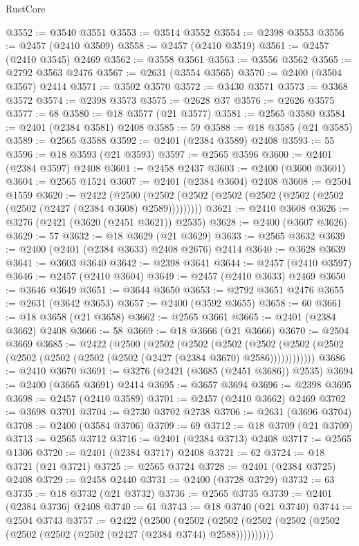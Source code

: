 \begin{lexlean}{RustCore}
\begin{coremodule}
@3552 := @3540 @3551
@3553 := @3514 @3552
@3554 := @2398 @3553
@3556 := @2457 (@2410 @3509)
@3558 := @2457 (@2410 @3519)
@3561 := @2457 (@2410 @3545) @2469
@3562 := @3558 @3561
@3563 := @3556 @3562
@3565 := @2792 @3563 @2476
@3567 := @2631 (@3554 @3565)
@3570 := @2400 (@3504 @3567) @2414
@3571 := @3502 @3570
@3572 := @3430 @3571
@3573 := @3368 @3572
@3574 := @2398 @3573
@3575 := @2628 @37
@3576 := @2626 @3575
@3577 := 68
@3580 := @18 @3577 (@21 @3577)
@3581 := @2565 @3580
@3584 := @2401 (@2384 @3581) @2408
@3585 := 59
@3588 := @18 @3585 (@21 @3585)
@3589 := @2565 @3588
@3592 := @2401 (@2384 @3589) @2408
@3593 := 55
@3596 := @18 @3593 (@21 @3593)
@3597 := @2565 @3596
@3600 := @2401 (@2384 @3597) @2408
@3601 := @2458 @2437
@3603 := @2400 (@3600 @3601)
@3604 := @2565 @1524
@3607 := @2401 (@2384 @3604) @2408
@3608 := @2504 @1559
@3620 := @2422
    (@2500 (@2502 (@2502 (@2502 (@2502 (@2502 (@2502 (@2502 (@2427 (@2384 @3608) @2589)))))))))
@3621 := @2410 @3608
@3626 := @3276 (@2421 (@3620 (@2451 @3621)) @2535)
@3628 := @2400 (@3607 @3626)
@3629 := 57
@3632 := @18 @3629 (@21 @3629)
@3633 := @2565 @3632
@3639 := @2400 (@2401 (@2384 @3633) @2408 @2676) @2414
@3640 := @3628 @3639
@3641 := @3603 @3640
@3642 := @2398 @3641
@3644 := @2457 (@2410 @3597)
@3646 := @2457 (@2410 @3604)
@3649 := @2457 (@2410 @3633) @2469
@3650 := @3646 @3649
@3651 := @3644 @3650
@3653 := @2792 @3651 @2476
@3655 := @2631 (@3642 @3653)
@3657 := @2400 (@3592 @3655)
@3658 := 60
@3661 := @18 @3658 (@21 @3658)
@3662 := @2565 @3661
@3665 := @2401 (@2384 @3662) @2408
@3666 := 58
@3669 := @18 @3666 (@21 @3666)
@3670 := @2504 @3669
@3685 := @2422
    (@2500
      (@2502
        (@2502
          (@2502
            (@2502 (@2502 (@2502 (@2502 (@2502 (@2502 (@2502 (@2427 (@2384 @3670) @2586))))))))))))
@3686 := @2410 @3670
@3691 := @3276 (@2421 (@3685 (@2451 @3686)) @2535)
@3694 := @2400 (@3665 @3691) @2414
@3695 := @3657 @3694
@3696 := @2398 @3695
@3698 := @2457 (@2410 @3589)
@3701 := @2457 (@2410 @3662) @2469
@3702 := @3698 @3701
@3704 := @2730 @3702 @2738
@3706 := @2631 (@3696 @3704)
@3708 := @2400 (@3584 @3706)
@3709 := 69
@3712 := @18 @3709 (@21 @3709)
@3713 := @2565 @3712
@3716 := @2401 (@2384 @3713) @2408
@3717 := @2565 @1306
@3720 := @2401 (@2384 @3717) @2408
@3721 := 62
@3724 := @18 @3721 (@21 @3721)
@3725 := @2565 @3724
@3728 := @2401 (@2384 @3725) @2408
@3729 := @2458 @2440
@3731 := @2400 (@3728 @3729)
@3732 := 63
@3735 := @18 @3732 (@21 @3732)
@3736 := @2565 @3735
@3739 := @2401 (@2384 @3736) @2408
@3740 := 61
@3743 := @18 @3740 (@21 @3740)
@3744 := @2504 @3743
@3757 := @2422
    (@2500
      (@2502 (@2502 (@2502 (@2502 (@2502 (@2502 (@2502 (@2502 (@2427 (@2384 @3744) @2588))))))))))

\end{coremodule}
\end{lexlean}
